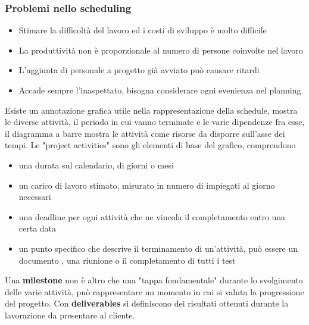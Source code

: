 \documentclass[10pt, letterpaper]{report}
\begin{document}
\subsubsection{Problemi nello scheduling}\begin{itemize}
    \item Stimare la difficoltà del lavoro ed i costi di sviluppo è molto difficile 
    \item La produttività non è proporzionale al numero di persone coinvolte nel lavoro 
    \item L'aggiunta di personale a progetto già avviato può causare ritardi  
    \item Accade sempre l'inaspettato, bisogna considerare ogni evenienza nel planning
\end{itemize}
Esiste un annotazione grafica utile nella rappresentazione 
della schedule, mostra le diverse attività, il periodo in cui 
vanno terminate e le varie dipendenze fra esse, il diagramma a barre 
mostra le attività come risorse da disporre sull'asse dei 
tempi. Le "project activities" sono gli elementi di base del 
grafico, comprendono \begin{itemize}
    \item una durata sul calendario, di giorni o mesi 
    \item un carico di lavoro stimato, misurato in numero di 
    impiegati al giorno necessari
    \item una deadline per ogni attività che ne vincola 
    il completamento entro una certa data
    \item un punto specifico che descrive il terminamento di 
    un'attività, può essere un documento , una riunione o il completamento 
    di tutti i test
\end{itemize}
Una \textbf{milestone} non è altro che una "tappa 
fondamentale" durante lo svolgimento delle varie attività, può 
rappresentare un momento in cui si valuta la progressione del 
progetto.\acc 
Con \textbf{deliverables} si definiscono dei risultati ottenuti 
durante la lavorazione da presentare al cliente.
\end{document}
